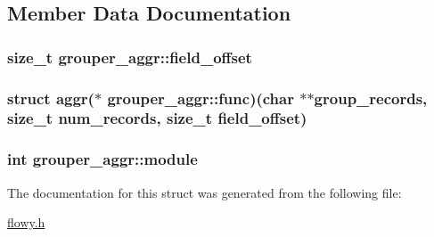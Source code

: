 \subsection{\-Member \-Data \-Documentation}
\hypertarget{structgrouper__aggr_aa9a662390c468b6ddf79e57228af09ef}{
\subsubsection[{field\-\_\-offset}]{\setlength{\rightskip}{0pt plus 5cm}size\-\_\-t {\bf grouper\-\_\-aggr\-::field\-\_\-offset}}}\label{structgrouper__aggr_aa9a662390c468b6ddf79e57228af09ef}
\hypertarget{structgrouper__aggr_a6c34e047d2d5ccfbcd1371703c4c04b1}{
\subsubsection[{func}]{\setlength{\rightskip}{0pt plus 5cm}struct {\bf aggr}($\ast$ {\bf grouper\-\_\-aggr\-::func})(char $\ast$$\ast$group\-\_\-records, size\-\_\-t num\-\_\-records, size\-\_\-t {\bf field\-\_\-offset})}}\label{structgrouper__aggr_a6c34e047d2d5ccfbcd1371703c4c04b1}
\hypertarget{structgrouper__aggr_aa154af699198c80586b3f05d06829dda}{
\subsubsection[{module}]{\setlength{\rightskip}{0pt plus 5cm}int {\bf grouper\-\_\-aggr\-::module}}}\label{structgrouper__aggr_aa154af699198c80586b3f05d06829dda}


\-The documentation for this struct was generated from the following file\-:\begin{DoxyCompactItemize}
\item 
\hyperlink{flowy_8h}{flowy.\-h}\end{DoxyCompactItemize}
